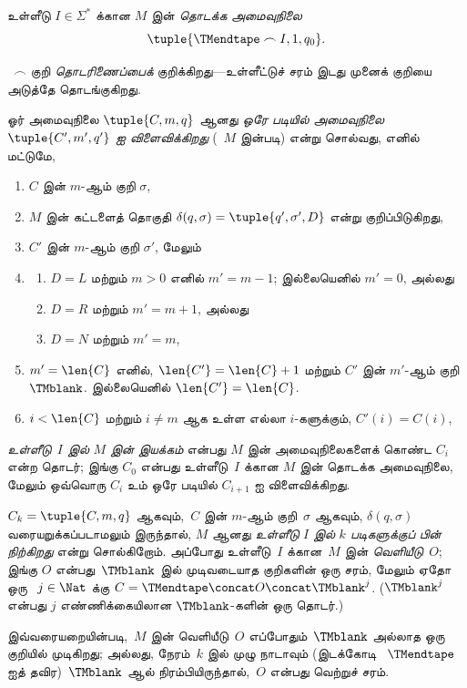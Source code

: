 \documentclass[../../../include/open-logic-section]{subfiles}
\begin{document}
\begin{defn}[தொடக்க அமைவுநிலை]
உள்ளீடு $I \in \Sigma^*$ க்கான $M$ இன் \emph{தொடக்க அமைவுநிலை}
\[
\tuple{\TMendtape \frown I, 1, q_0}.
\]
\end{defn}

\begin{explain}
~$\frown$ குறி \emph{தொடரிணைப்பைக்} குறிக்கிறது---உள்ளீட்டுச் சரம்
இடது முனைக் குறியை அடுத்தே தொடங்குகிறது.
\end{explain}

\begin{defn}
ஓர் அமைவுநிலை $\tuple{C, m, q}$ ஆனது \emph{ஒரே படியில் அமைவுநிலை
$\tuple{C', m', q'}$ ஐ விளைவிக்கிறது} (~$M$ இன்படி) என்று சொல்வது,
எனில் மட்டுமே,
\begin{enumerate}
\item $C$ இன் $m$-ஆம் குறி $\sigma$,
\item $M$ இன் கட்டளைத் தொகுதி $\delta(q, \sigma) =
  \tuple{q', \sigma', D}$ என்று குறிப்பிடுகிறது,
\item $C'$ இன் $m$-ஆம் குறி $\sigma'$, மேலும்
\item
\begin{enumerate}
\item $D = L$ மற்றும் $m>0$ எனில் $m' = m - 1$; இல்லையெனில் $m'=0$, அல்லது
\item $D = R$ மற்றும் $m' = m + 1$, அல்லது
\item $D = N$ மற்றும் $m' = m$,
\end{enumerate}
\item $m' = \len{C}$ எனில், $\len{C'} = \len{C} + 1$ மற்றும் $C'$ இன்
  $m'$-ஆம் குறி~$\TMblank$. இல்லையெனில் $\len{C'}=\len{C}$.
\item $i < \len{C}$ மற்றும் $i \neq m$ ஆக உள்ள எல்லா $i$-களுக்கும்,
  $C'(i) = C(i)$,
\end{enumerate}
\end{defn}

\begin{defn}
\emph{உள்ளீடு~$I$ இல் $M$ இன் இயக்கம்} என்பது $M$ இன்
அமைவுநிலைகளைக் கொண்ட $C_i$ என்ற தொடர்; இங்கு $C_0$ என்பது உள்ளீடு~$I$
க்கான $M$ இன் தொடக்க அமைவுநிலை, மேலும் ஒவ்வொரு $C_i$ உம் ஒரே படியில்
$C_{i+1}$ ஐ விளைவிக்கிறது.

$C_k = \tuple{C, m, q}$ ஆகவும்,~$C$ இன் $m$-ஆம் குறி~$\sigma$ ஆகவும்,
$\delta(q, \sigma)$ வரையறுக்கப்படாமலும் இருந்தால், $M$ ஆனது
\emph{உள்ளீடு $I$ இல் $k$ படிகளுக்குப் பின் நிற்கிறது} என்று சொல்கிறோம்.
அப்போது உள்ளீடு~$I$ க்கான~$M$ இன் \emph{வெளியீடு}~$O$; இங்கு $O$
என்பது~$\TMblank$ இல் முடிவடையாத குறிகளின் ஒரு சரம், மேலும் ஏதோ ஒரு
~$j \in \Nat$ க்கு $C = \TMendtape \concat O \concat \TMblank^j$.
($\TMblank^j$ என்பது $j$ எண்ணிக்கையிலான $\TMblank$-களின் ஒரு தொடர்.)
\end{defn}

\begin{explain}
இவ்வரையறையின்படி,~$M$ இன் வெளியீடு~$O$ எப்போதும்~$\TMblank$ அல்லாத
ஒரு குறியில் முடிகிறது; அல்லது, நேரம்~$k$ இல் முழு நாடாவும் (இடக்கோடி
~$\TMendtape$ ஐத் தவிர)~$\TMblank$ ஆல் நிரம்பியிருந்தால்,~$O$ என்பது
வெற்றுச் சரம்.
\end{explain}
\end{document}
